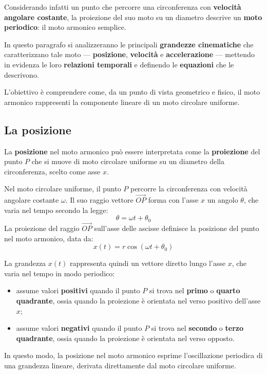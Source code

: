 \documentclass[a4paper,12pt]{article}
\begin{document}
 Considerando infatti un punto che percorre una circonferenza con \textbf{velocità angolare costante}, la proiezione del suo moto su un diametro descrive un \textbf{moto periodico}: il moto armonico semplice.

In questo paragrafo si analizzeranno le principali \textbf{grandezze cinematiche} che caratterizzano tale moto — \textbf{posizione}, \textbf{velocità} e \textbf{accelerazione} — mettendo in evidenza le loro \textbf{relazioni temporali} e definendo le \textbf{equazioni} che le descrivono.

 L'obiettivo è comprendere come, da un punto di vista geometrico e fisico, il moto armonico rappresenti la componente lineare di un moto circolare uniforme.

 
\subsection{La posizione}


La \textbf{posizione} nel moto armonico può essere interpretata come la \textbf{proiezione} del punto $P$ che si muove di moto circolare uniforme su un diametro della circonferenza, scelto come asse $x$.

Nel moto circolare uniforme, il punto $P$ percorre la circonferenza con velocità angolare costante $\omega$. Il suo raggio vettore $\overrightarrow{OP}$ forma con l’asse $x$ un angolo $\theta$, che varia nel tempo secondo la legge:
\[
\theta = \omega t + \theta_0
\]
La proiezione del raggio $\overrightarrow{OP}$ sull’asse delle ascisse definisce la posizione del punto nel moto armonico, data da:
\[
x(t) = r \cos(\omega t + \theta_0)
\]

La grandezza $x(t)$ rappresenta quindi un vettore diretto lungo l’asse $x$, che varia nel tempo in modo periodico:
\begin{itemize}
    \item assume valori \textbf{positivi} quando il punto $P$ si trova nel \textbf{primo} o \textbf{quarto quadrante}, ossia quando la proiezione è orientata nel verso positivo dell’asse $x$;
    \item assume valori \textbf{negativi} quando il punto $P$ si trova nel \textbf{secondo} o \textbf{terzo quadrante}, ossia quando la proiezione è orientata nel verso opposto.
\end{itemize}

In questo modo, la posizione nel moto armonico esprime l’oscillazione periodica di una grandezza lineare, derivata direttamente dal moto circolare uniforme.
\end{document}
